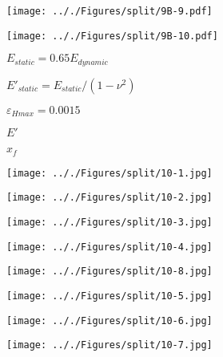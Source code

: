 \documentclass[onecolumn,11pt]{report}
\def\lthtmlcheckvsize{\ifdim\ht\sizebox<\vsize 
  \ifdim\wd\sizebox<\hsize\expandafter\hfill\fi \expandafter\vfill
  \else\expandafter\vss\fi}%
\begin{document}
{\newpage\clearpage
{}%
\texttt{[image: .././Figures/split/9B-9.pdf]}%
\lthtmlpictureZ
\lthtmlcheckvsize\clearpage}

{\newpage\clearpage
{}%
\texttt{[image: .././Figures/split/9B-10.pdf]}%
\lthtmlpictureZ
\lthtmlcheckvsize\clearpage}

{\newpage\clearpage
{}%
$ E_{static} = 0.65 E_{dynamic}$%
\lthtmlindisplaymathZ
\lthtmlcheckvsize\clearpage}

{\newpage\clearpage
{}%
$ E'_{static} = E_{static} / (1-\nu^2)$%
\lthtmlindisplaymathZ
\lthtmlcheckvsize\clearpage}

{\newpage\clearpage
{}%
$ \varepsilon_{Hmax} = 0.0015$%
\lthtmlindisplaymathZ
\lthtmlcheckvsize\clearpage}

{\newpage\clearpage
{}%
$ E'$%
\lthtmlindisplaymathZ
\lthtmlcheckvsize\clearpage}

{\newpage\clearpage
{}%
$ x_f$%
\lthtmlindisplaymathZ
\lthtmlcheckvsize\clearpage}

{\newpage\clearpage
{}%
\texttt{[image: .././Figures/split/10-1.jpg]}%
\lthtmlpictureZ
\lthtmlcheckvsize\clearpage}

{\newpage\clearpage
{}%
\texttt{[image: .././Figures/split/10-2.jpg]}%
\lthtmlpictureZ
\lthtmlcheckvsize\clearpage}

{\newpage\clearpage
{}%
\texttt{[image: .././Figures/split/10-3.jpg]}%
\lthtmlpictureZ
\lthtmlcheckvsize\clearpage}

{\newpage\clearpage
{}%
\texttt{[image: .././Figures/split/10-4.jpg]}%
\lthtmlpictureZ
\lthtmlcheckvsize\clearpage}

{\newpage\clearpage
{}%
\texttt{[image: .././Figures/split/10-8.jpg]}%
\lthtmlpictureZ
\lthtmlcheckvsize\clearpage}

{\newpage\clearpage
{}%
\texttt{[image: .././Figures/split/10-5.jpg]}%
\lthtmlpictureZ
\lthtmlcheckvsize\clearpage}

{\newpage\clearpage
{}%
\texttt{[image: .././Figures/split/10-6.jpg]}%
\lthtmlpictureZ
\lthtmlcheckvsize\clearpage}

{\newpage\clearpage
{}%
\texttt{[image: .././Figures/split/10-7.jpg]}%
\lthtmlpictureZ
\lthtmlcheckvsize\clearpage}

\end{document}
